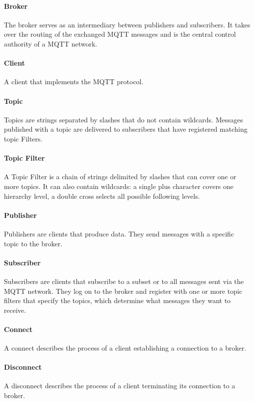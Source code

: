 \paragraph{Broker}
The broker serves as an intermediary between publishers and subscribers.
It takes over the routing of the exchanged MQTT messages and is the central control authority of a MQTT network.
\paragraph{Client}
A client that implements the MQTT protocol. 
\paragraph{Topic}
Topics are strings separated by slashes that do not contain wildcards.
Messages published with a topic are delivered to subscribers that have registered matching topic Filters.
\paragraph{Topic Filter}
A Topic Filter is a chain of strings delimited by slashes that 
can cover one or more topics. 
It can also contain wildcards: a single plus character covers one hierarchy level, a double cross selects all possible following levels.
\paragraph{Publisher}
Publishers are clients that produce data.
They send messages with a specific topic to the broker.
\paragraph{Subscriber}
Subscribers are clients that subscribe to a subset or to all messages sent via the
MQTT network.
They log on to the broker and register with one or more topic filters that specify the topics, which determine what messages they want to receive.
\paragraph{Connect}
A connect describes the process of a client establishing a connection to a broker.
\paragraph{Disconnect}
A disconnect describes the process of a client terminating its connection to a broker.


